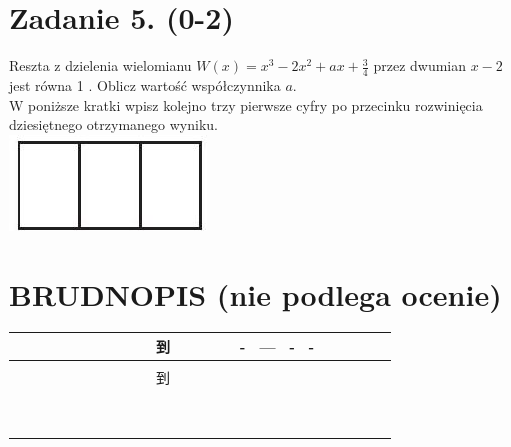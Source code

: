 \documentclass[10pt]{article}
\begin{document}
\section*{Zadanie 5. (0-2)}
Reszta z dzielenia wielomianu \(W(x)=x^{3}-2 x^{2}+a x+\frac{3}{4}\) przez dwumian \(x-2\) jest równa 1 . Oblicz wartość współczynnika \(a\).\\
W poniższe kratki wpisz kolejno trzy pierwsze cyfry po przecinku rozwinięcia dziesiętnego otrzymanego wyniku.\\
\includegraphics[max width=\textwidth, center]{2024_11_21_3120cbc7edd07b3a101fg-04}

\section*{BRUDNOPIS (nie podlega ocenie)}
\begin{center}
\begin{tabular}{|c|c|c|c|c|c|c|c|c|c|c|c|c|c|c|c|c|c|c|c|c|c|c|c|}
\hline
 &  &  &  &  &  &  &  &  &  & 到 &  &  &  &  & - & — & - & - &  &  &  &  &  \\
\hline
 &  &  &  &  &  &  &  &  &  &  &  &  &  &  &  &  &  &  &  &  &  &  &  \\
\hline
 &  &  &  &  &  &  &  &  &  & 到 &  &  &  &  &  &  &  &  &  &  &  &  &  \\
\hline
 &  &  &  &  &  &  &  &  &  &  &  &  &  &  &  &  &  &  &  &  &  &  &  \\
\hline
 &  &  &  &  &  &  &  &  &  &  &  &  &  &  &  &  &  &  &  &  &  &  &  \\
\hline
 &  &  &  &  &  &  &  &  &  &  &  &  &  &  &  &  &  &  &  &  &  &  &  \\
\hline
 &  &  &  &  &  &  &  &  &  &  &  &  &  &  &  &  &  &  &  &  &  &  &  \\
\hline
 &  &  &  &  &  &  &  &  &  &  &  &  &  &  &  &  &  &  &  &  &  &  &  \\
\hline
 &  &  &  &  &  &  &  &  &  &  &  &  &  &  &  &  &  &  &  &  &  &  &  \\
\hline
 &  &  &  &  &  &  &  &  &  &  &  &  &  &  &  &  &  &  &  &  &  &  &  \\
\hline
 &  &  &  &  &  &  &  &  &  &  &  &  &  &  &  &  &  &  &  &  &  &  &  \\
\hline
 &  &  &  &  &  &  &  &  &  &  &  &  &  &  &  &  &  &  &  &  &  &  &  \\
\hline
\end{tabular}
\end{center}
\end{document}
